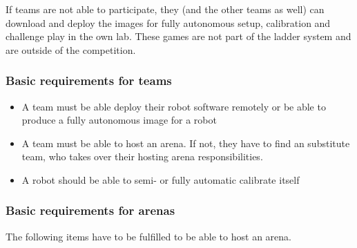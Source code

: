 If teams are not able to participate, they (and the other teams as well) can download and deploy the images for fully autonomous setup, calibration and challenge play in the own lab. These games are not part of the ladder system and are outside of the competition.

\subsubsection{Basic requirements for teams}
\label{sec:c3_BasicRequirementsForTeams}
\begin{itemize}
    \item A team must be able deploy their robot software remotely or be able to produce a fully autonomous image for a robot
    \item A team must be able to host an arena. If not, they have to find an substitute team, who takes over their hosting arena responsibilities.
    \item A robot should be able to semi- or fully automatic calibrate itself
\end{itemize}

\subsubsection{Basic requirements for arenas}
\label{sec:c3_BasicRequirementsForArenas}
The following items have to be fulfilled to be able to host an arena.

